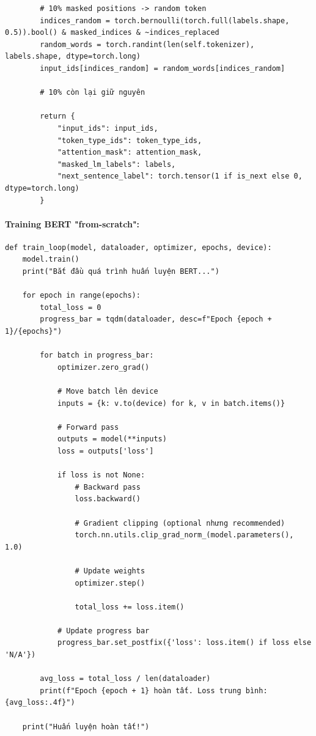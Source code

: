 \begin{verbatim}
        # 10% masked positions -> random token  
        indices_random = torch.bernoulli(torch.full(labels.shape, 0.5)).bool() & masked_indices & ~indices_replaced
        random_words = torch.randint(len(self.tokenizer), labels.shape, dtype=torch.long)
        input_ids[indices_random] = random_words[indices_random]
        
        # 10% còn lại giữ nguyên

        return {
            "input_ids": input_ids,
            "token_type_ids": token_type_ids,
            "attention_mask": attention_mask,
            "masked_lm_labels": labels,
            "next_sentence_label": torch.tensor(1 if is_next else 0, dtype=torch.long)
        }
\end{verbatim}


\paragraph{Training BERT "from-scratch":}
\begin{verbatim}
def train_loop(model, dataloader, optimizer, epochs, device):
    model.train()
    print("Bắt đầu quá trình huấn luyện BERT...")
    
    for epoch in range(epochs):
        total_loss = 0
        progress_bar = tqdm(dataloader, desc=f"Epoch {epoch + 1}/{epochs}")
        
        for batch in progress_bar:
            optimizer.zero_grad()
            
            # Move batch lên device
            inputs = {k: v.to(device) for k, v in batch.items()}
            
            # Forward pass
            outputs = model(**inputs)
            loss = outputs['loss']
            
            if loss is not None:
                # Backward pass
                loss.backward()
                
                # Gradient clipping (optional nhưng recommended)
                torch.nn.utils.clip_grad_norm_(model.parameters(), 1.0)
                
                # Update weights
                optimizer.step()
                
                total_loss += loss.item()
                
            # Update progress bar
            progress_bar.set_postfix({'loss': loss.item() if loss else 'N/A'})

        avg_loss = total_loss / len(dataloader)
        print(f"Epoch {epoch + 1} hoàn tất. Loss trung bình: {avg_loss:.4f}")
        
    print("Huấn luyện hoàn tất!")
\end{verbatim}

